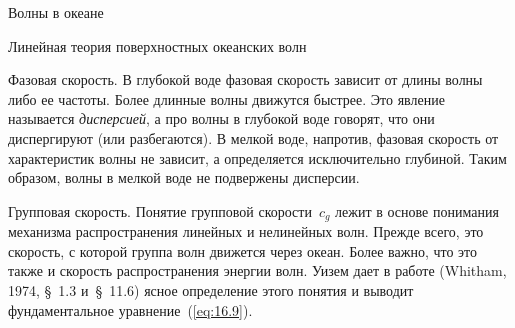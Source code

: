 \begin{chapter}{Волны в океане}
\begin{section}{Линейная теория поверхностных океанских волн}
\begin{paragraph}{Фазовая скорость.}
В глубокой воде фазовая скорость зависит от длины волны либо ее частоты. 
Более длинные волны движутся быстрее. Это явление называется \emph{дисперсией},
а про волны в глубокой воде говорят, что они диспергируют (или разбегаются). 
В мелкой воде, напротив, фазовая скорость от характеристик волны не зависит,
а определяется исключительно глубиной. Таким образом, волны в мелкой
воде не подвержены дисперсии.
%
\end{paragraph}

\begin{paragraph}{Групповая скорость.}
Понятие групповой
скорости~$c_{g}$ лежит в основе понимания механизма распространения 
линейных и нелинейных волн. Прежде всего, это скорость, с которой группа волн
движется через океан. Более важно, что это также и скорость распространения
энергии волн.
Уизем дает в работе (Whitham, 1974, \S~1.3 и~\S~11.6) ясное определение этого
понятия и выводит фундаментальное уравнение~(\ref{eq:16.9}).
%


\end{paragraph}
\end{section}
\end{chapter}
